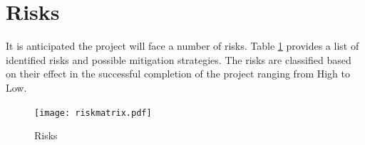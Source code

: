 \documentclass[12pt]{extreport}
\begin{document}
\section{Risks}
\label{sec:risks}
It is anticipated the project will face a number of risks. Table \ref{tab:risks} provides a list of identified risks and possible mitigation strategies. The risks are classified based on their effect in the successful completion of the project ranging from High to Low.

\begin{center}
\begin{figure}
\texttt{[image: riskmatrix.pdf]}
\caption{Risks}
\label{tab:risks}
\end{figure}
\end{center}






\end{document}
